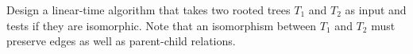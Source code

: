 
%
%
%
%




%


\begin{ps1}
Design a linear-time algorithm that takes two rooted trees $T_1$ and $T_2$ as input and tests if they are isomorphic. Note that an isomorphism between $T_1$ and $T_2$ must preserve edges as well as parent-child relations.
\end{ps1}

